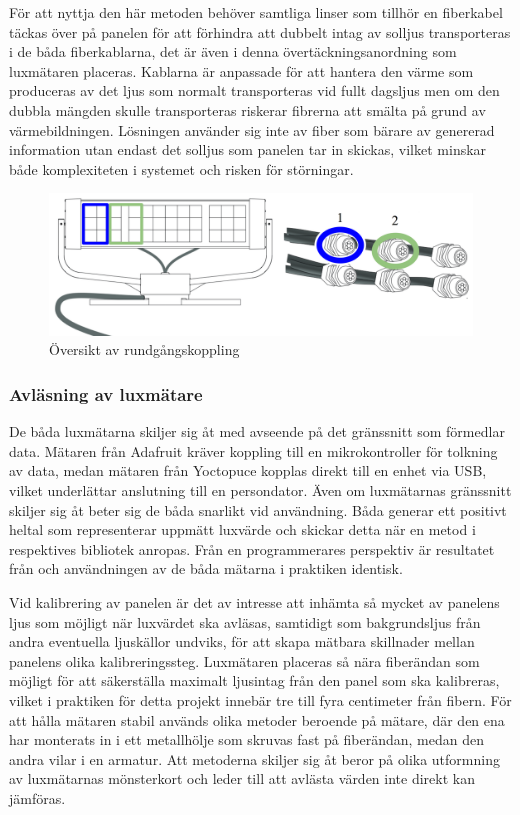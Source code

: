             För att nyttja den här metoden behöver samtliga linser som tillhör en fiberkabel täckas över på panelen för att förhindra att dubbelt intag av solljus transporteras i de båda fiberkablarna, det är även i denna övertäckningsanordning som luxmätaren placeras. Kablarna är anpassade för att hantera den värme som produceras av det ljus som normalt transporteras vid fullt dagsljus men om den dubbla mängden skulle transporteras riskerar fibrerna att smälta på grund av värmebildningen. Lösningen använder sig inte av fiber som bärare av genererad information utan endast det solljus som panelen tar in skickas, vilket minskar både komplexiteten i systemet och risken för störningar.

            \begin{figure}
                 \includegraphics[scale=0.25]{res/img/loop}
            \caption{\label{fig:loop} Översikt av rundgångskoppling}
            \end{figure} 

        \subsubsection{Avläsning av luxmätare} %
        \label{ssub:avlasning_av_luxmatare}
            De båda luxmätarna skiljer sig åt med avseende på det gränssnitt som förmedlar data. Mätaren från Adafruit kräver koppling till en mikrokontroller för tolkning av data, medan mätaren från Yoctopuce kopplas direkt till en enhet via USB, vilket underlättar anslutning till en persondator. Även om luxmätarnas gränssnitt skiljer sig åt beter sig de båda snarlikt vid användning. Båda generar ett positivt heltal som representerar uppmätt luxvärde och skickar detta när en metod i respektives bibliotek anropas. Från en programmerares perspektiv är resultatet från och användningen av de båda mätarna i praktiken identisk.\bigskip

            Vid kalibrering av panelen är det av intresse att inhämta så mycket av panelens ljus som möjligt när luxvärdet ska avläsas, samtidigt som bakgrundsljus från andra eventuella ljuskällor undviks, för att skapa mätbara skillnader mellan panelens olika kalibreringssteg. Luxmätaren placeras så nära fiberändan som möjligt för att säkerställa maximalt ljusintag från den panel som ska kalibreras, vilket i praktiken för detta projekt innebär tre till fyra centimeter från fibern. För att hålla mätaren stabil används olika metoder beroende på mätare, där den ena har monterats in i ett metallhölje som skruvas fast på fiberändan, medan den andra vilar i en armatur. Att metoderna skiljer sig åt beror på olika utformning av luxmätarnas mönsterkort och leder till att avlästa värden inte direkt kan jämföras.\bigskip 


